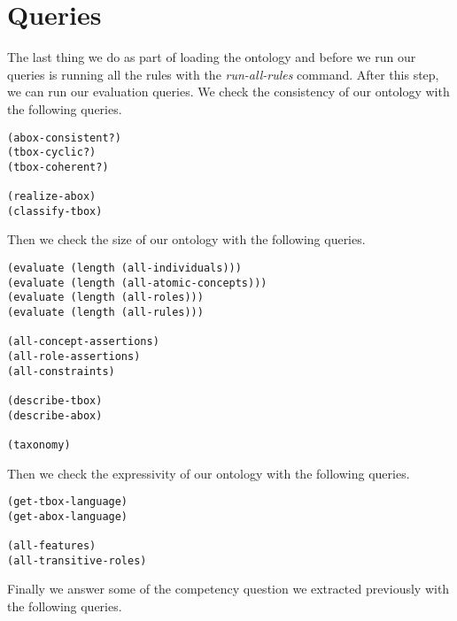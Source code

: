\documentclass[a4paper,12pt]{report}
\begin{document}
\section{Queries}
The last thing we do as part of loading the ontology and before we run our queries is running all the rules with the \textit{run-all-rules} command. After this step, we can run our evaluation queries.
We check the consistency of our ontology with the following queries.
\begin{lstlisting}
(abox-consistent?)
(tbox-cyclic?)
(tbox-coherent?)

(realize-abox)
(classify-tbox)
\end{lstlisting}
Then we check the size of our ontology with the following queries.
\begin{lstlisting}
(evaluate (length (all-individuals)))
(evaluate (length (all-atomic-concepts)))
(evaluate (length (all-roles)))
(evaluate (length (all-rules)))

(all-concept-assertions)
(all-role-assertions)
(all-constraints)

(describe-tbox)
(describe-abox)

(taxonomy)
\end{lstlisting}
Then we check the expressivity of our ontology with the following queries.
\begin{lstlisting}
(get-tbox-language)
(get-abox-language)

(all-features)
(all-transitive-roles)
\end{lstlisting}
Finally we answer some of the competency question we extracted previously with the following queries.
\end{document}
